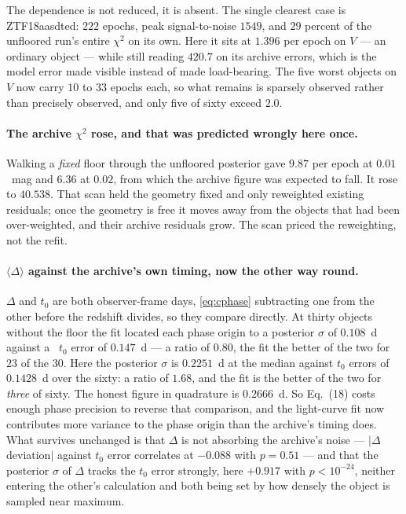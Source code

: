 \documentclass[11pt]{article}
\begin{document}
\medskip\noindent
The dependence is not reduced, it is absent. The single clearest case is ZTF18aasdted:
$222$ epochs, peak signal-to-noise $1549$, and $29$ percent of the unfloored run's entire
$\chi^{2}$ on its own. Here it sits at $1.396$ per epoch on $V$ --- an ordinary object ---
while still reading $420.7$ on its archive errors, which is the model error made visible
instead of made load-bearing. The five worst objects on $V$ now carry $10$ to $33$ epochs
each, so what remains is sparsely observed rather than precisely observed, and only five of
sixty exceed $2.0$.

\paragraph{The archive $\chi^{2}$ rose, and that was predicted wrongly here once.} Walking
a \emph{fixed} floor through the unfloored posterior gave $9.87$ per epoch at $0.01$~mag
and $6.36$ at $0.02$, from which the archive figure was expected to fall. It rose to
$40.538$. That scan held the geometry fixed and only reweighted existing residuals; once
the geometry is free it moves away from the objects that had been over-weighted, and their
archive residuals grow. The scan priced the reweighting, not the refit.

\paragraph{$\langle\Delta\rangle$ against the archive's own timing, now the other way
round.} $\Delta$ and $t_{0}$ are both observer-frame days, \eqref{eq:cphase} subtracting
one from the other before the redshift divides, so they compare directly. At thirty objects
without the floor the fit located each phase origin to a posterior $\sigma$ of $0.108$~d
against a \salt\ $t_{0}$ error of $0.147$~d --- a ratio of $0.80$, the fit the better of
the two for $23$ of the $30$. Here the posterior $\sigma$ is $0.2251$~d at the median
against $t_{0}$ errors of $0.1428$~d over the sixty: a ratio of $1.68$, and the fit is the
better of the two for \emph{three} of sixty. The honest figure in quadrature is $0.2666$~d.
So Eq.~(18) costs enough phase precision to reverse that comparison, and the
light-curve fit now contributes more variance to the phase origin than the archive's
timing does. What survives unchanged is that $\Delta$ is not absorbing the archive's noise
--- $\lvert\Delta$ deviation$\rvert$ against $t_{0}$ error correlates at $-0.088$ with
$p = 0.51$ --- and that the posterior $\sigma$ of $\Delta$ tracks the $t_{0}$ error
strongly, here $+0.917$ with $p < 10^{-24}$, neither entering the other's calculation and
both being set by how densely the object is sampled near maximum.
\end{document}
